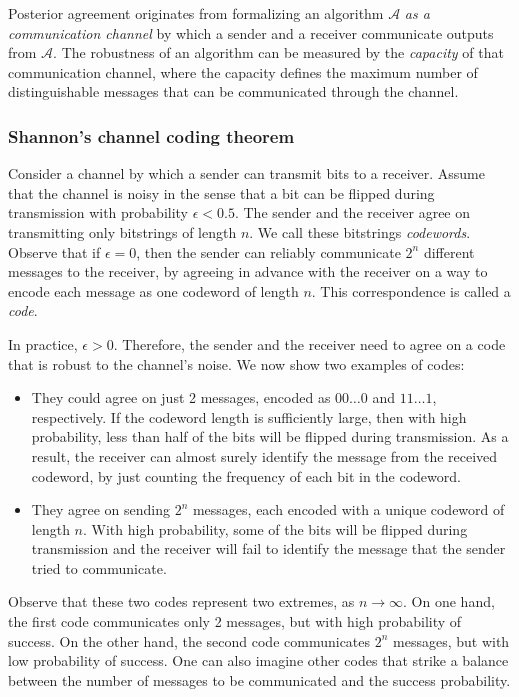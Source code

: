 Posterior agreement originates from formalizing an algorithm $\mathcal{A}$ \emph{as a communication channel} by which a sender and a receiver communicate outputs from $\mathcal{A}$. The robustness of an algorithm can be measured by the \emph{capacity} of that communication channel, where the capacity defines the maximum number of distinguishable messages that can be communicated through the channel.

\subsubsection*{Shannon's channel coding theorem}

Consider a channel by which a sender can transmit bits to a receiver. Assume that the channel is noisy in the sense that a bit can be flipped during transmission with probability $\epsilon < 0.5$. The sender and the receiver agree on transmitting only bitstrings of length $n$. We call these bitstrings \emph{codewords}. Observe that if $\epsilon = 0$, then the sender can reliably communicate $2^n$ different messages to the receiver, by agreeing in advance with the receiver on a way to encode each message as one codeword of length $n$. This correspondence is called a \emph{code}. 

In practice, $\epsilon > 0$. Therefore, the sender and the receiver need to agree on a code that is robust to the channel's noise. We now show two examples of codes:

\begin{itemize}
\item They could agree on just 2 messages, encoded as $00\ldots0$ and $11\ldots 1$, respectively. If the codeword length is sufficiently large, then with high probability, less than half of the bits will be flipped during transmission. As a result, the receiver can almost surely identify the message from the received codeword, by just counting the frequency of each bit in the codeword.
\item They agree on sending $2^n$ messages, each encoded with a unique codeword of length $n$. With high probability, some of the bits will be flipped during transmission and the receiver will fail to identify the message that the sender tried to communicate.
\end{itemize}

Observe that these two codes represent two extremes, as $n \to \infty$. On one hand, the first code communicates only 2 messages, but with high probability of success. On the other hand, the second code communicates $2^n$ messages, but with low probability of success. One can also imagine other codes that strike a balance between the number of messages to be communicated and the success probability.

